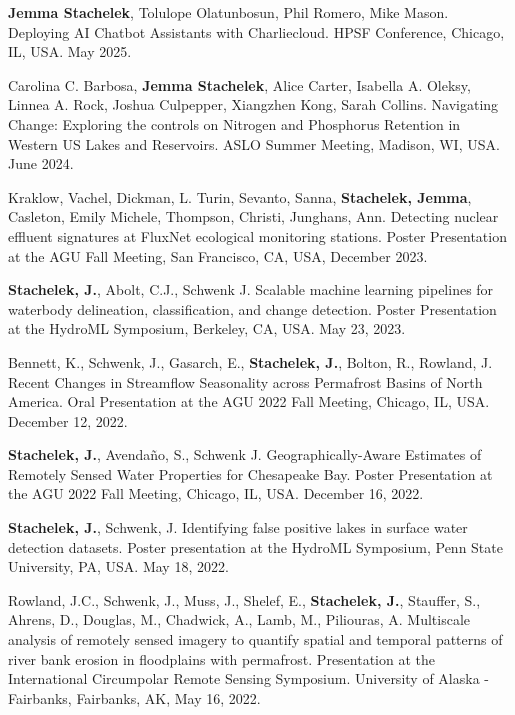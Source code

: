 \documentclass[11pt]{article}
\makeatletter
\newlength{\bibhang}
\newlength{\bibsep}
 {\@listi \global\bibsep\itemsep \global\advance\bibsep by\parsep}
\newenvironment{bibenum*}
  {\renewcommand\labelenumi{[\theenumi]}%
   \etaremune[
     topsep=0pt,
     itemsep=\bibsep,
     parsep=0pt,partopsep=0pt,
     itemindent=-\bibhang,
     leftmargin=0.8em
     ]
     }
  {\endetaremune}
\makeatother
\begin{document}
\begin{bibenum*}

    \item \textbf{Jemma Stachelek}, Tolulope Olatunbosun, Phil Romero, Mike Mason. Deploying AI Chatbot Assistants with Charliecloud. HPSF Conference, Chicago, IL, USA. May 2025.
    
    \item Carolina C. Barbosa, \textbf{Jemma Stachelek}, Alice Carter, Isabella A. Oleksy, Linnea A. Rock, Joshua Culpepper, Xiangzhen Kong, Sarah Collins. Navigating Change: Exploring the controls on Nitrogen and Phosphorus Retention in Western US Lakes and Reservoirs. ASLO Summer Meeting, Madison, WI, USA. June 2024.
    
    \item Kraklow, Vachel, Dickman, L. Turin, Sevanto, Sanna, \textbf{Stachelek, Jemma}, Casleton, Emily Michele, Thompson, Christi, Junghans, Ann. Detecting nuclear effluent signatures at FluxNet ecological monitoring stations. Poster Presentation at the AGU Fall Meeting, San Francisco, CA, USA, December 2023.

    \item \textbf{Stachelek, J.}, Abolt, C.J., Schwenk J. Scalable machine learning pipelines for waterbody delineation, classification, and change detection. Poster Presentation at the HydroML Symposium, Berkeley, CA, USA. May 23, 2023.

    \item Bennett, K., Schwenk, J., Gasarch, E., \textbf{Stachelek, J.}, Bolton, R., Rowland, J. Recent Changes in Streamflow Seasonality across Permafrost Basins of North America. Oral Presentation at the AGU 2022 Fall Meeting, Chicago, IL, USA. December 12, 2022.

    \item \textbf{Stachelek, J.}, Avendaño, S., Schwenk J. Geographically-Aware Estimates of Remotely Sensed Water Properties for Chesapeake Bay. Poster Presentation at the AGU 2022 Fall Meeting, Chicago, IL, USA. December 16, 2022.
    
    \item \textbf{Stachelek, J.}, Schwenk, J. Identifying false positive lakes in surface water detection datasets. Poster presentation at the HydroML Symposium, Penn State University, PA, USA. May 18, 2022.
    
    \item Rowland, J.C., Schwenk, J., Muss, J., Shelef, E., \textbf{Stachelek, J.}, Stauffer, S., Ahrens, D., Douglas, M., Chadwick, A., Lamb, M., Piliouras, A. Multiscale analysis of remotely sensed imagery to quantify spatial and temporal patterns of river bank erosion in floodplains with permafrost. Presentation at the International Circumpolar Remote Sensing Symposium. University of Alaska - Fairbanks, Fairbanks, AK, May 16, 2022.


\end{bibenum*}
\end{document}
